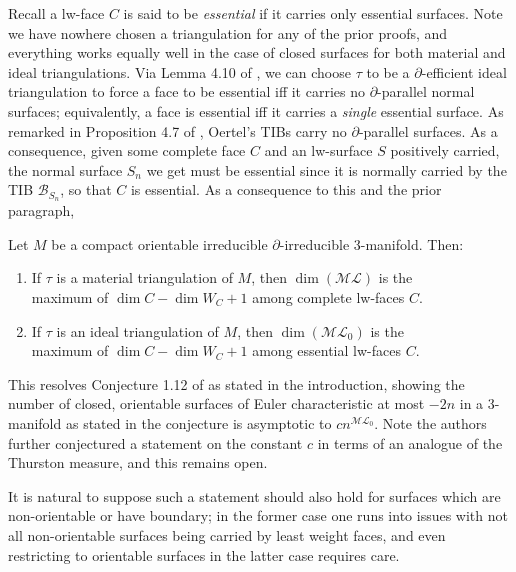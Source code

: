 \documentclass[12pt]{article}
\newcommand{\del}{\partial}
\newcommand{\B}{\mathcal{B}}
\newcommand{\ML}{\mathcal{ML}}
\renewcommand{\it}{\textit}
\theoremstyle{nonumberdefinition}
\theoremstyle{empty}
\theoremstyle{empty}
\begin{document}
Recall a lw-face $C$ is said to be \it{essential} if it carries only essential surfaces. Note we have nowhere chosen a triangulation for any of the prior proofs, and everything works equally well in the case of closed surfaces for both material and ideal triangulations. Via Lemma 4.10 of \cite{dunfieldCountingEssentialSurfaces2022}, we can choose $\tau$ to be a $\del$-efficient ideal triangulation to force a face to be essential iff it carries no $\del$-parallel normal surfaces; equivalently, a face is essential iff it carries a \it{single} essential surface. As remarked in Proposition 4.7 of \cite{oertelMeasuredLaminations3Manifolds1988}, Oertel's TIBs carry no $\partial$-parallel surfaces. As a consequence, given some complete face $C$ and an lw-surface $S$ positively carried, the normal surface $S_n$ we get must be essential since it is normally carried by the TIB $\B_{S_n}$, so that $C$ is essential. As a consequence to this and the prior paragraph,

\begin{thm}\label{thm:mainResult}
Let $M$ be a compact orientable irreducible $\del$-irreducible 3-manifold. Then:
	{
	\begin{enumerate}[itemsep=0cm,leftmargin=2em,font=\upshape]
		\item If $\tau$ is a material triangulation of $M$, then $\dim( \ML)$ is the \\maximum of $\dim C - \dim W_C + 1$ among complete lw-faces $C$.
		\item If $\tau$ is an ideal triangulation of $M$, then $\dim( \ML_0)$ is the \\maximum of $\dim C - \dim W_C + 1$ among essential lw-faces $C$.
	\end{enumerate}}
\end{thm}

This resolves Conjecture 1.12 of \cite{dunfieldCountingEssentialSurfaces2022} as stated in the introduction, showing the number of closed, orientable surfaces of Euler characteristic at most $-2n$ in a 3-manifold as stated in the conjecture is asymptotic to $c n^{\ML_0}$. Note the authors further conjectured a statement on the constant $c$ in terms of an analogue of the Thurston measure, and this remains open.

It is natural to suppose such a statement should also hold for surfaces which are non-orientable or have boundary; in the former case one runs into issues with not all non-orientable surfaces being carried by least weight faces, and even restricting to orientable surfaces in the latter case requires care. 
\pagebreak
\end{document}
